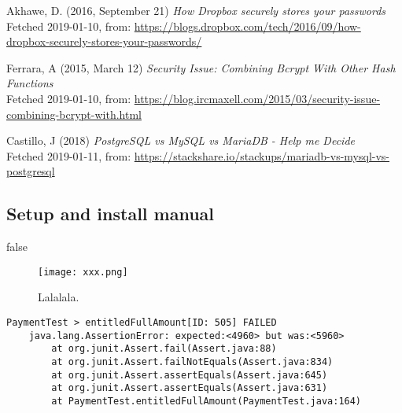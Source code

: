 \documentclass[12pt,a4paper]{report}
\begin{document}
{\begin{thebibliography}{1}
Akhawe, D. (2016, September 21) {\em How Dropbox securely stores your passwords} \\
Fetched 2019-01-10, from:
\url{https://blogs.dropbox.com/tech/2016/09/how-dropbox-securely-stores-your-passwords/}

Ferrara, A (2015, March 12) {\em Security Issue: Combining Bcrypt With Other Hash Functions} \\
Fetched 2019-01-10, from:
\url{https://blog.ircmaxell.com/2015/03/security-issue-combining-bcrypt-with.html}

Castillo, J (2018) {\em PostgreSQL vs MySQL vs MariaDB - Help me Decide} \\
Fetched 2019-01-11, from:
\url{https://stackshare.io/stackups/mariadb-vs-mysql-vs-postgresql}

\end{thebibliography}}

\begin{appendix}
\chapter{Setup and install manual}

\end{appendix}

\if false

\begin{figure}[H]
    \centering
    \texttt{[image: xxx.png]}
    \caption{Lalalala.}
    \label{fig:my_label}
\end{figure}

\begin{verbatim}
PaymentTest > entitledFullAmount[ID: 505] FAILED
    java.lang.AssertionError: expected:<4960> but was:<5960>
        at org.junit.Assert.fail(Assert.java:88)
        at org.junit.Assert.failNotEquals(Assert.java:834)
        at org.junit.Assert.assertEquals(Assert.java:645)
        at org.junit.Assert.assertEquals(Assert.java:631)
        at PaymentTest.entitledFullAmount(PaymentTest.java:164)
\end{verbatim}
\end{document}
